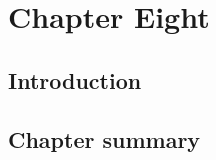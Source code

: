 %
%
\chapter{Chapter Eight} \label{chap:eight}

\section{Introduction} \label{sec:intro}


\section{Chapter summary}

